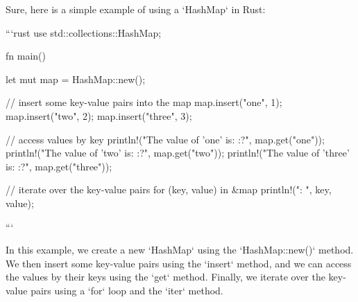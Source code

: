 Sure, here is a simple example of using a `HashMap` in Rust:

```rust
use std::collections::HashMap;

fn main() {
    let mut map = HashMap::new();

    // insert some key-value pairs into the map
    map.insert("one", 1);
    map.insert("two", 2);
    map.insert("three", 3);

    // access values by key
    println!("The value of 'one' is: {:?}", map.get("one"));
    println!("The value of 'two' is: {:?}", map.get("two"));
    println!("The value of 'three' is: {:?}", map.get("three"));

    // iterate over the key-value pairs
    for (key, value) in &map {
        println!("{}: {}", key, value);
    }
}
```

In this example, we create a new `HashMap` using the `HashMap::new()` method. We then insert some key-value pairs using the `insert` method, and we can access the values by their keys using the `get` method. Finally, we iterate over the key-value pairs using a `for` loop and the `iter` method.
